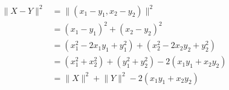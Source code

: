 \documentclass[preview]{standalone}
\begin{document}
\begin{align*}
\lVert X-Y \rVert ^{2}& = \lVert (x_{1}-y_{1},x_{2}-y_{2}) \rVert^{2} \\ & =(x_{1}-y_{1})^2 + (x_{2}-y_{2})^2 \\ & =(x_{1}^2 - 2x_{1}y_{1}+ y_{1}^2)+(x_{2}^2 - 2x_{2}y_{2}+ y_{2}^2) \\ & =(x_{1}^2+x_{2}^2)+(y_{1}^2+y_{2}^2) -2(x_{1}y_{1}+x_{2}y_{2}) \\ & = \lVert X \rVert ^{2} + \lVert Y \rVert ^{2} -2(x_{1}y_{1}+x_{2}y_{2})
\end{align*}
\end{document}
